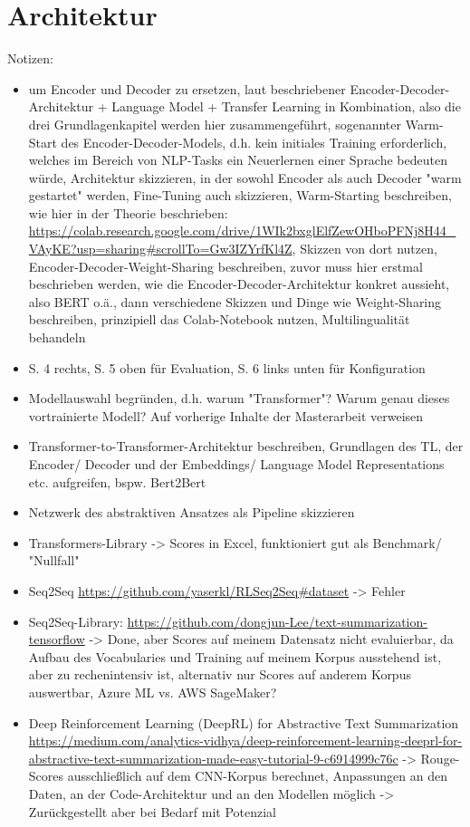 \section{Architektur}
Notizen:
\begin{itemize}
	\item \cite{ROT20} um Encoder und Decoder zu ersetzen, laut beschriebener Encoder-Decoder-Architektur + Language Model + Transfer Learning in Kombination, also die drei Grundlagenkapitel werden hier zusammengeführt, sogenannter Warm-Start des Encoder-Decoder-Models, d.h. kein initiales Training erforderlich, welches im Bereich von NLP-Tasks ein Neuerlernen einer Sprache bedeuten würde, Architektur skizzieren, in der sowohl Encoder als auch Decoder "warm gestartet" werden, Fine-Tuning auch skizzieren, Warm-Starting beschreiben, wie hier in der Theorie beschrieben: \url{https://colab.research.google.com/drive/1WIk2bxglElfZewOHboPFNj8H44_VAyKE?usp=sharing#scrollTo=Gw3IZYrfKl4Z}, Skizzen von dort nutzen, Encoder-Decoder-Weight-Sharing beschreiben, zuvor muss hier erstmal beschrieben werden, wie die Encoder-Decoder-Architektur konkret aussieht, also BERT o.ä., dann verschiedene Skizzen und Dinge wie Weight-Sharing beschreiben, prinzipiell das Colab-Notebook nutzen, Multilingualität behandeln
	\item \cite{YAN19} S. 4 rechts, S. 5 oben für Evaluation, S. 6 links unten für Konfiguration
	\item Modellauswahl begründen, d.h. warum "Transformer"? Warum genau dieses vortrainierte Modell? Auf vorherige Inhalte der Masterarbeit verweisen
	\item Transformer-to-Transformer-Architektur beschreiben, Grundlagen des TL, der Encoder/ Decoder und der Embeddings/ Language Model Representations etc. aufgreifen, bspw. Bert2Bert
	\item Netzwerk des abstraktiven Ansatzes als Pipeline skizzieren
	\item Transformers-Library -> Scores in Excel, funktioniert gut als Benchmark/ "Nullfall"
	\item Seq2Seq \url{https://github.com/yaserkl/RLSeq2Seq#dataset} -> Fehler
	\item Seq2Seq-Library: \url{https://github.com/dongjun-Lee/text-summarization-tensorflow} -> Done, aber Scores auf meinem Datensatz nicht evaluierbar, da Aufbau des Vocabularies und Training auf meinem Korpus ausstehend ist, aber zu rechenintensiv ist, alternativ nur Scores auf anderem Korpus auswertbar, Azure ML vs. AWS SageMaker?
	\item Deep Reinforcement Learning (DeepRL) for Abstractive Text Summarization \url{https://medium.com/analytics-vidhya/deep-reinforcement-learning-deeprl-for-abstractive-text-summarization-made-easy-tutorial-9-c6914999c76c} -> Rouge-Scores ausschließlich auf dem CNN-Korpus berechnet, Anpassungen an den Daten, an der Code-Architektur und an den Modellen möglich -> Zurückgestellt aber bei Bedarf mit Potenzial

\end{itemize}
